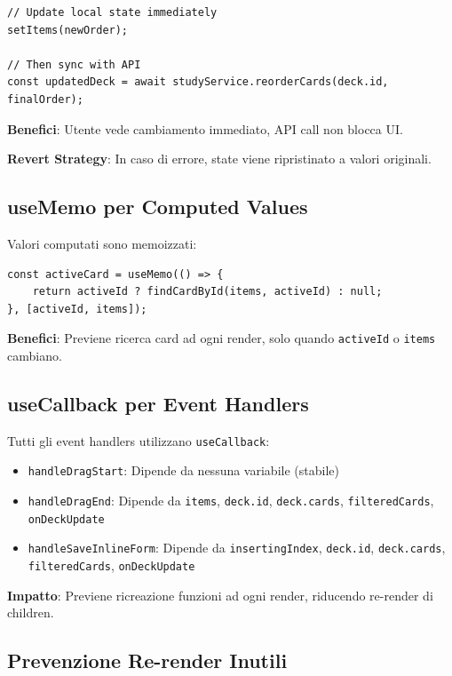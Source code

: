 \documentclass[11pt,a4paper]{article}
\begin{document}
\begin{lstlisting}[style=typescript, caption=Optimistic Update Pattern]
// Update local state immediately
setItems(newOrder);

// Then sync with API
const updatedDeck = await studyService.reorderCards(deck.id, finalOrder);
\end{lstlisting}

\textbf{Benefici}: Utente vede cambiamento immediato, API call non blocca UI.

\textbf{Revert Strategy}: In caso di errore, state viene ripristinato a valori originali.

\subsection{useMemo per Computed Values}

Valori computati sono memoizzati:

\begin{lstlisting}[style=typescript, caption=Memoization]
const activeCard = useMemo(() => {
    return activeId ? findCardById(items, activeId) : null;
}, [activeId, items]);
\end{lstlisting}

\textbf{Benefici}: Previene ricerca card ad ogni render, solo quando \texttt{activeId} o \texttt{items} cambiano.

\subsection{useCallback per Event Handlers}

Tutti gli event handlers utilizzano \texttt{useCallback}:

\begin{itemize}
    \item \texttt{handleDragStart}: Dipende da nessuna variabile (stabile)
    \item \texttt{handleDragEnd}: Dipende da \texttt{items}, \texttt{deck.id}, \texttt{deck.cards}, \texttt{filteredCards}, \texttt{onDeckUpdate}
    \item \texttt{handleSaveInlineForm}: Dipende da \texttt{insertingIndex}, \texttt{deck.id}, \texttt{deck.cards}, \texttt{filteredCards}, \texttt{onDeckUpdate}
\end{itemize}

\textbf{Impatto}: Previene ricreazione funzioni ad ogni render, riducendo re-render di children.

\subsection{Prevenzione Re-render Inutili}
\end{document}
